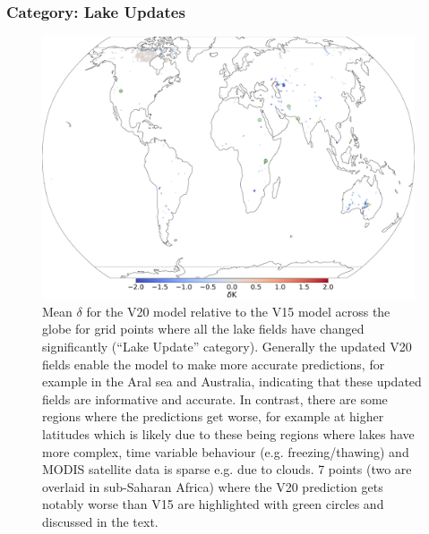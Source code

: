 \documentclass[twocolumn]{article}
\begin{document}
\subsubsection{Category: Lake Updates}\label{V20Lake}
\begin{figure}[t]
	\includegraphics[width=0.98\textwidth]{lake_haver.png}
	\caption{Mean $\delta$ for the V20 model relative to the V15 model across the globe for grid points where all the lake fields have changed significantly (``Lake Update'' category). Generally the updated V20 fields enable the model to make more accurate predictions, for example in the Aral sea and Australia, indicating that these updated fields are informative and accurate. In contrast, there are some regions where the predictions get worse,  for example at higher latitudes which is likely due to these being regions where lakes have more complex, time variable behaviour (e.g. freezing/thawing) and MODIS satellite data is sparse e.g. due to clouds. 7 points (two are overlaid in sub-Saharan Africa) where the V20 prediction gets notably worse than V15 are highlighted with green circles and discussed in the text.}
	\label{fig:bitstring_100110}
\end{figure}
\end{document}
